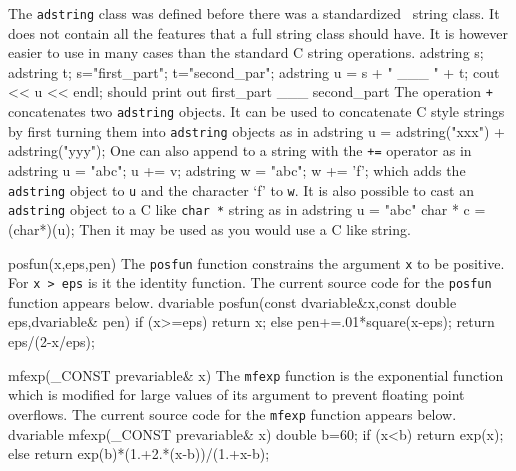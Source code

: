 The {\tt adstring} class was defined before there was a standardized
\cplus\ string class. It does not contain all the features
that a full string class should have. It is however easier to use
in many cases than the standard C string operations.
\beginexamplea
  adstring s;
  adstring t;
  s="first_part";
  t="second_par";
  adstring u = s + " ___ " + t;
  cout << u << endl;
\endexample
  should print out
\beginexamplea
   first_part ___ second_part
\endexample
The operation {\tt +} concatenates two {\tt adstring} objects.
It can be used to concatenate C style strings by first
turning them into {\tt adstring} objects as in
\beginexamplea
   adstring u = adstring("xxx") + adstring("yyy");
\endexample
\noindent One can also append to a string with the {\tt +=}
operator as in
\beginexamplea
   adstring u = "abc"; 
   u += v; 
   adstring w = "abc"; 
   w += 'f'; 
\endexample
\noindent which adds the {\tt adstring} object to {\tt u} and the
character `f' to {\tt w}.
It is also possible to cast an {\tt adstring} object to
a C like {\tt char *} string as in
\beginexamplea
   adstring u = "abc"
   char * c = (char*)(u);
\endexample
\noindent Then it may be used as you would use a C like string.

\beginexamplea
posfun(x,eps,pen)
\endexample
\noindent The {\tt posfun} function constrains the argument {\tt x} to be positive.
For {\tt x > eps} is it the identity function.
The current source code for the {\tt posfun} function appears below.
\beginexamplea
dvariable posfun(const dvariable&x,const double eps,dvariable& pen)
{
  if (x>=eps) {
    return x;
  } else {
    pen+=.01*square(x-eps);
    return eps/(2-x/eps);
  }
}
\endexample

\beginexamplea
mfexp(_CONST prevariable& x)
\endexample
\noindent The {\tt mfexp} function is the exponential function 
which is modified for large values of its argument to prevent
floating point overflows. 
The current source code for the {\tt mfexp} function appears below.
\beginexamplea
  dvariable mfexp(_CONST prevariable& x)
  {
    double b=60;
    if (x<b) 
    {
      return exp(x);
    }
    else
    {
      return exp(b)*(1.+2.*(x-b))/(1.+x-b);
    }
  }
\endexample

